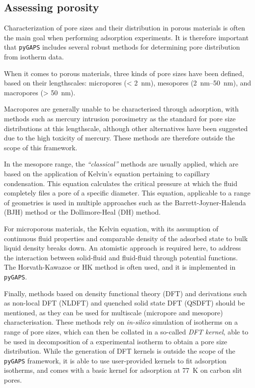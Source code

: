 
\subsection{Assessing porosity}

Characterization of pore sizes and their distribution in porous materials
is often the main goal when performing adsorption experiments. It is
therefore important that \texttt{pyGAPS} includes several robust methods
for determining pore distribution from isotherm data.

When it comes to porous materials, three kinds of pore sizes have been
defined, based on their lengthscales: micropores (\SI{< 2}{\nano\metre}),
mesopores (\SIrange{2}{50}{\nano\metre}), and macropores (\SI{> 50}{\nano\metre}).

Macropores are generally unable to be characterised through adsorption,
with methods such as mercury intrusion porosimetry as the standard for pore
size distributions at this lengthscale, although other alternatives have
been suggested~\cite{rouquerolCharacterizationMacroporousSolids2012} due
to the high toxicity of mercury. These methods are therefore outside
the scope of this framework.

In the mesopore range, the \textit{``classical''} methods are usually
applied, which are based on the application of Kelvin's equation
pertaining to capillary condensation. This equation calculates the
critical pressure at which the fluid completely files a pore of a
specific diameter. This equation, applicable to a range of geometries
is used in multiple approaches such as the Barrett-Joyner-Halenda
(BJH) method or the Dollimore-Heal (DH) method.

For microporous materials, the Kelvin equation, with its assumption
of continuous fluid properties and comparable density of the adsorbed
state to bulk liquid density breaks down. An atomistic approach
is required here, to address the interaction between solid-fluid
and fluid-fluid through potential functions. The Horvath-Kawazoe or
HK method is often used, and it is implemented in \texttt{pyGAPS}.

Finally, methods based on density functional theory (DFT) and
derivations such as non-local DFT (NLDFT) and quenched solid state DFT
(QSDFT) should be mentioned, as they can be used for multiscale
(micropore and mesopore) characterisation. These methods rely on
\textit{in-silico} simulation of isotherms on a range of pore sizes,
which can then be collated in a so-called \textit{DFT kernel}, able to
be used in decomposition of a experimental isotherm to obtain a
pore size distribution. While the generation of DFT kernels is
outside the scope of the \texttt{pyGAPS} framework, it is able to use
user-provided kernels to fit adsorption isotherms, and comes with
a basic kernel for  adsorption at \SI{77}{\kelvin} on
carbon slit pores.

